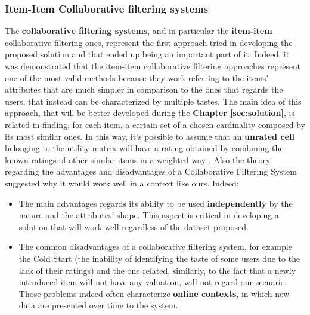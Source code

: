 \subsubsection{Item-Item Collaborative filtering systems}
The \textbf{collaborative filtering systems}, and in particular the \textbf{item-item} collaborative filtering ones, represent the first approach tried in developing the proposed solution and that ended up being an important part of it. Indeed, it was demonstrated that the item-item collaborative filtering approaches represent one of the most valid methods because they work referring to the items' attributes that are much simpler in comparison to the ones that regards the users, that instead can be characterized by multiple tastes.\cite{Book-ch9} The main idea of this approach, that will be better developed during the \textbf{Chapter \ref{sec:solution}}, is related in finding, for each item, a certain set of a chosen cardinality composed by its most similar ones. In this way, it's possible to assume that an \textbf{unrated cell} belonging to the utility matrix will have a rating obtained by combining the known ratings of other similar items in a weighted way \cite{Book-ch9}.
Also the theory regarding the advantages and disadvantages of a Collaborative Filtering System suggested why it would work well in a context like ours. Indeed:
\begin{itemize}
    \item The main advantages regards its ability to be used \textbf{independently} by the nature and the attributes' shape. This aspect is critical in developing a solution that will work well regardless of the dataset proposed.
    \item The common disadvantages of a collaborative filtering system, for example the Cold Start (the inability of identifying the taste of some users due to the lack of their ratings) and the one related, similarly, to the fact that a newly introduced item will not have any valuation, will not regard our scenario. Those problems indeed often characterize  \textbf{online contexts}, in which new data are presented over time to the system.
\end{itemize}
